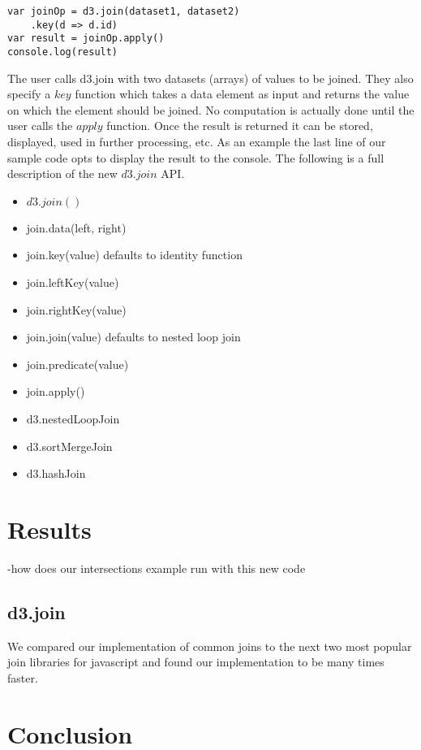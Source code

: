 \documentclass[a4paper]{article}
\begin{document}
\lstset{language=Java} 
\begin{lstlisting}
var joinOp = d3.join(dataset1, dataset2)
    .key(d => d.id)
var result = joinOp.apply()
console.log(result)
\end{lstlisting}
	
The user calls d3.join with two datasets (arrays) of values to be joined. They also specify a $key$ function which takes a data element as input and returns the value on which the element should be joined. No computation is actually done until the user calls the $apply$ function. Once the result is returned it can be stored, displayed, used in further processing, etc. As an example the last line of our sample code opts to display the result to the console. The following is a full description of the new $d3.join$ API.

\begin{itemize}
\item $d3.join()$
\item join.data(left, right)
\item join.key(value)
defaults to identity function
\item join.leftKey(value)
\item join.rightKey(value)
\item join.join(value)
defaults to nested loop join
\item join.predicate(value)
\item join.apply()
\item d3.nestedLoopJoin
\item d3.sortMergeJoin
\item d3.hashJoin
\end{itemize}

\section{Results}
-how does our intersections example run with this new code

\subsection{d3.join}
We compared our implementation of common joins to the next two most popular join libraries for javascript and found our implementation to be many times faster.
\section{Conclusion}
\end{document}
